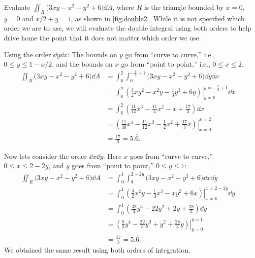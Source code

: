 \begin{example}\label{ex_double2}%
Evaluate $\iint_R \bigl(3xy-x^2-y^2+6\bigr)\dd A$, where $R$ is the triangle bounded by $x=0$, $y=0$ and $x/2+y=1$, as shown in \autoref{fig:double2}.
\solution
While it is not specified which order we are to use, we will evaluate the double integral using both orders to help drive home the point that it does not matter which order we use.


Using the order $\dd y\dd x$:
The bounds on $y$ go from ``curve to curve,'' i.e., $0\leq y\leq 1-x/2$, and the bounds on $x$ go from ``point to point,'' i.e., $0\leq x\leq 2$.
\begin{align*}
\iint_R (3xy-x^2-y^2+6\bigl)\dd A &= \int_0^2\int_0^{-\frac x2+1} (3xy-x^2-y^2+6\bigr)\dd y\dd x\\
		&= \int_0^2\left.\left(\frac32xy^2-x^2y-\frac13y^3+6y\right)\right|_{y=0}^{y=-\frac x2+1}\dd x\\
		&= \int_0^2 \left(\frac{11}{12}x^3-\frac{11}{4}x^2-x+\frac{17}3\right)\dd x \\
		&= \left.\left(\frac{11}{48}x^4-\frac{11}{12}x^3-\frac12x^2+\frac{17}3x\right)\right|_{x=0}^{x=2}\\
		&= \frac{17}3=5.\overline{6}.
\end{align*}

Now lets consider the order $\dd x \dd y$. Here $x$ goes from ``curve to curve,'' $0\leq x\leq 2-2y$, and $y$ goes from ``point to point,'' $0\leq y\leq 1$:
{\allowdisplaybreaks
\begin{align*}
\iint_R \bigl(3xy-x^2-y^2+6\bigr)\dd A
	&= \int_0^1\int_0^{2-2y} \bigl(3xy-x^2-y^2+6\bigr)\dd x\dd y\\
	&= \int_0^1\left.\left(\frac32x^2y-\frac13x^3-xy^2+6x\right)\right|_{x=0}^{x=2-2y}\dd y\\
	&= \int_0^1\left(\frac{32}3y^3-22y^2+2y+\frac{28}3\right)\dd y\\
	&=\left.\left(\frac83y^4-\frac{22}3y^3+y^2+\frac{28}3y\right)\right|_{y=0}^{y=1}\\
	&=\frac{17}3=5.\overline{6}.
\end{align*}}
We obtained the same result using both orders of integration.
\end{example}


